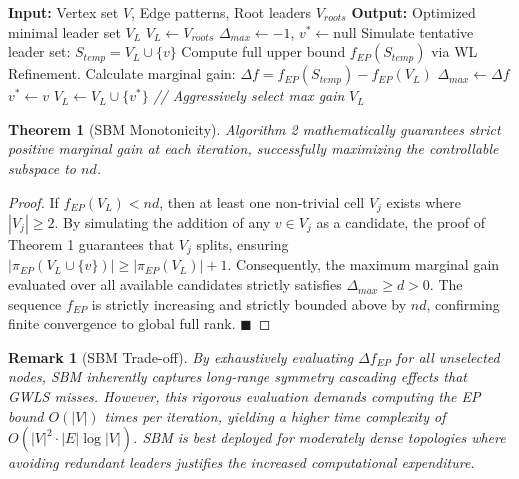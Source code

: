 \documentclass{IEEEtran}
\newtheorem{theorem}{Theorem}
\newtheorem{remark}{Remark}
\begin{document}
	\begin{algorithm}[htbp]
		\caption{Submodular Bound Maximization (SBM)}
		\label{alg:sbm}
		\begin{algorithmic}[1]
			\STATE \textbf{Input:} Vertex set $V$, Edge patterns, Root leaders $V_{roots}$
			\STATE \textbf{Output:} Optimized minimal leader set $V_L$
			\STATE $V_L \leftarrow V_{roots}$
			\STATE $\Delta_{max} \leftarrow -1$, $v^* \leftarrow \text{null}$
			\STATE Simulate tentative leader set: $S_{temp} = V_L \cup \{v\}$
			\STATE Compute full upper bound $f_{EP}(S_{temp})$ via WL Refinement.
			\STATE Calculate marginal gain: $\Delta f = f_{EP}(S_{temp}) - f_{EP}(V_L)$
			\STATE $\Delta_{max} \leftarrow \Delta f$
			\STATE $v^* \leftarrow v$
			\ENDIF
			\ENDFOR
			\STATE $V_L \leftarrow V_L \cup \{v^*\}$ \textit{// Aggressively select max gain}
			\ENDWHILE
			\RETURN $V_L$
		\end{algorithmic}
	\end{algorithm}
	
	\begin{theorem}[SBM Monotonicity]
		Algorithm 2 mathematically guarantees strict positive marginal gain at each iteration, successfully maximizing the controllable subspace to $nd$.
	\end{theorem}
	\begin{proof}
		If $f_{EP}(V_L) < nd$, then at least one non-trivial cell $V_j$ exists where $|V_j| \ge 2$. By simulating the addition of any $v \in V_j$ as a candidate, the proof of Theorem 1 guarantees that $V_j$ splits, ensuring $|\pi_{EP}(V_L \cup \{v\})| \ge |\pi_{EP}(V_L)| + 1$. Consequently, the maximum marginal gain evaluated over all available candidates strictly satisfies $\Delta_{max} \ge d > 0$. The sequence $f_{EP}$ is strictly increasing and strictly bounded above by $nd$, confirming finite convergence to global full rank. \hfill $\blacksquare$
	\end{proof}
	
	\begin{remark}[SBM Trade-off]
		By exhaustively evaluating $\Delta f_{EP}$ for all unselected nodes, SBM inherently captures long-range symmetry cascading effects that GWLS misses. However, this rigorous evaluation demands computing the EP bound $O(|V|)$ times per iteration, yielding a higher time complexity of $O(|V|^2 \cdot |E| \log |V|)$. SBM is best deployed for moderately dense topologies where avoiding redundant leaders justifies the increased computational expenditure.
	\end{remark}
	
\end{document}
